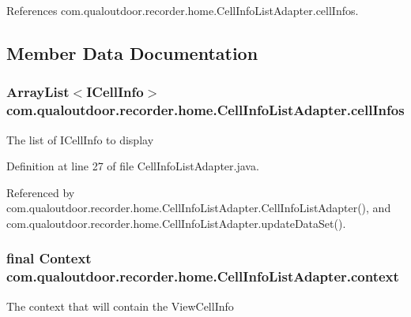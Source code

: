 References com.\-qualoutdoor.\-recorder.\-home.\-Cell\-Info\-List\-Adapter.\-cell\-Infos.



\subsection{Member Data Documentation}
\hypertarget{classcom_1_1qualoutdoor_1_1recorder_1_1home_1_1CellInfoListAdapter_a6c988429563ad648eafa80875c705174}{
\subsubsection[{cell\-Infos}]{\setlength{\rightskip}{0pt plus 5cm}Array\-List$<${\bf I\-Cell\-Info}$>$ com.\-qualoutdoor.\-recorder.\-home.\-Cell\-Info\-List\-Adapter.\-cell\-Infos\hspace{0.3cm}{\ttfamily [private]}}}\label{classcom_1_1qualoutdoor_1_1recorder_1_1home_1_1CellInfoListAdapter_a6c988429563ad648eafa80875c705174}
The list of I\-Cell\-Info to display 

Definition at line 27 of file Cell\-Info\-List\-Adapter.\-java.



Referenced by com.\-qualoutdoor.\-recorder.\-home.\-Cell\-Info\-List\-Adapter.\-Cell\-Info\-List\-Adapter(), and com.\-qualoutdoor.\-recorder.\-home.\-Cell\-Info\-List\-Adapter.\-update\-Data\-Set().

\hypertarget{classcom_1_1qualoutdoor_1_1recorder_1_1home_1_1CellInfoListAdapter_a2aa1a3a1bd5520c9a11ad12aa005e648}{
\subsubsection[{context}]{\setlength{\rightskip}{0pt plus 5cm}final Context com.\-qualoutdoor.\-recorder.\-home.\-Cell\-Info\-List\-Adapter.\-context\hspace{0.3cm}{\ttfamily [private]}}}\label{classcom_1_1qualoutdoor_1_1recorder_1_1home_1_1CellInfoListAdapter_a2aa1a3a1bd5520c9a11ad12aa005e648}
The context that will contain the View\-Cell\-Info 

